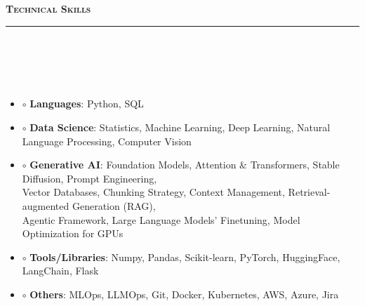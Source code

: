\documentclass[a4paper,10pt]{article}
\makeatletter
\newcommand{\lsep}{-0.5cm}
\newcommand{\resheading}[1]{{\small
        {
            \begin{minipage}
                {0.992\textwidth}\textbf{{\textsc{#1 \vphantom{p\^{E}} }}}
                \\[-0.3cm]
                \hrule
            \end{minipage}
            \\[-0.5cm]
        }
 }}
\newcommand{\resEduHeading}[6]{
  \begin{tabular*}{7.1in}{l @{\extracolsep{\fill}} r}
    \textbf{\normalsize #1} \\
    \textit{#2} & \textit{#3} \\
    {\normalsize #4} & \textit{{#5} \textbf{#6}}
  \end{tabular*}
}
\makeatother
\begin{document}

\vspace{-4pt}
\noindent
\resheading{\textbf{\large Technical Skills}}\\[\lsep] 
\\[-0.3cm]


\begin{itemize}
  \item[] $\circ$ \hspace{0.0cm} \textbf{Languages}: Python, SQL\\[-0.55cm]
  \item[] $\circ$  \hspace{0.0cm} \textbf{Data Science}: Statistics, Machine Learning, Deep Learning, Natural Language Processing, Computer Vision  \\[-0.55cm]
  \item[] $\circ$  \hspace{0.0cm} \textbf{Generative AI}: Foundation Models, Attention \& Transformers, Stable Diffusion, Prompt Engineering, \\ \hspace*{0.3cm} Vector Databases, Chunking Strategy, Context Management, Retrieval-augmented Generation (RAG), \\ \hspace*{0.3cm} Agentic Framework, Large Language Models' Finetuning, Model Optimization for GPUs \\[-0.55cm]
  \item[] $\circ$  \hspace{0.0cm} \textbf{Tools/Libraries}: Numpy, Pandas, Scikit-learn, PyTorch, HuggingFace, LangChain, Flask \\[-0.55cm]
  \item[] $\circ$  \hspace{0.0cm} \textbf{Others}: MLOps, LLMOps, Git, Docker, Kubernetes, AWS, Azure, Jira
\end{itemize}
\end{document}
